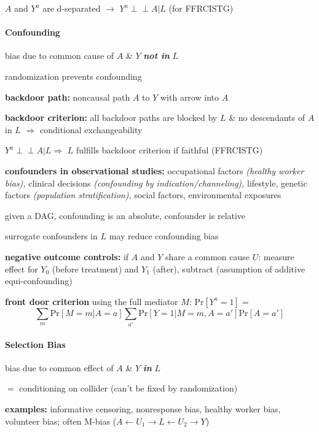 \documentclass[8pt,oneside]{extarticle}
\newcommand{\indep}{\perp \!\!\! \perp}
\begin{document}
\begin{multicols}{2}
\noindent $A$ and $Y^a$ are d-separated $\rightarrow$ $Y^a \indep A|L$ (for FFRCISTG)



\paragraph{\large Confounding} bias due to common cause of $A$ \& $Y$ \textbf{\textit{not in}} $L$

\noindent randomization prevents confounding

\noindent \textbf{backdoor path:} noncausal path $A$ to $Y$ with arrow into $A$

\noindent \textbf{backdoor criterion:} all backdoor paths are blocked by $L$ \& no descendants of $A$ in $L$ $\Rightarrow$ conditional exchangeability

\noindent $Y^a {\indep} A|L \Rightarrow$ $L$ fulfills backdoor criterion if faithful (FFRCISTG)



\noindent \textbf{confounders in observational studies:} occupational factors \textit{(healthy worker bias),} clinical decisions \textit{(confounding by indication/channeling),} lifestyle, genetic factors \textit{(population stratification),} social factors, environmental exposures

\noindent given a DAG, confounding is an absolute, confounder is relative

\noindent surrogate confounders in $L$ may reduce confounding bias

\noindent \textbf{negative outcome controls:} if $A$ and $Y$ share a common cause $U$: measure effect for $Y_0$ (before treatment) and $Y_1$ (after), subtract (assumption of additive equi-confounding)

\noindent \textbf{front door criterion} using the full mediator $M$: $\mathrm{Pr}\left[Y^a=1\right]=$
$$\sum_m \mathrm{Pr}\left[M=m|A=a\right] \sum_{a'} \mathrm{Pr}\left[Y=1|M=m, A=a'\right]\mathrm{Pr}\left[A=a'\right]$$


\paragraph{\large Selection Bias} bias due to common effect of $A$ \& $Y$ \textbf{\textit{in}} $L$

 \noindent $=$ conditioning on collider (can't be fixed by randomization)


\noindent \textbf{examples:} informative censoring, nonresponse bias, healthy worker bias, volunteer bias; often M-bias ($A {\leftarrow} U_1 {\to} L {\leftarrow} U_2 {\to} Y$)



\end{multicols}
\end{document}
